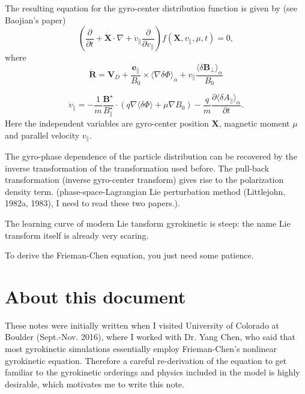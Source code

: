 \documentclass{llncs}
\begin{document}
The resulting equation for the gyro-center distribution function is given by
(see Baojian's paper)
\begin{equation}
  \left( \frac{\partial}{\partial t} + \dot{\mathbf{X}} \cdot \nabla +
  \dot{v}_{\parallel} \frac{\partial}{\partial v_{\parallel}} \right) f
  (\mathbf{X}, v_{\parallel}, \mu, t) = 0,
\end{equation}
where
\begin{equation}
  \dot{\mathbf{R}} =\mathbf{V}_D + \frac{\mathbf{e}_{\parallel}}{B_0} \times
  \langle \nabla \delta \Phi \rangle_{\alpha} + v_{\parallel} \frac{\langle
  \delta \mathbf{B}_{\perp} \rangle_{\alpha}}{B_0}
\end{equation}

\begin{equation}
  \dot{v}_{\parallel} = - \frac{1}{m} 
  \frac{\mathbf{B}^{\star}}{B_{\parallel}^{\star}} \cdot (q \nabla \langle
  \delta \Phi \rangle + \mu \nabla B_0) - \frac{q}{m}  \frac{\partial \langle
  \delta A_{\parallel} \rangle_{\alpha}}{\partial t} .
\end{equation}
Here the independent variables are gyro-center position $\mathbf{X}$, magnetic
moment $\mu$ and parallel velocity $v_{\parallel}$.

The gyro-phase dependence of the particle distribution can be recovered by the
inverse transformation of the transformation used before. The pull-back
transformation (inverse gyro-center transform) gives rise to the polarization
density term. (phase-space-Lagrangian Lie perturbation method (Littlejohn,
1982a, 1983), I need to read these two papers.).

The learning curve of modern Lie tansform gyrokinetic is steep: the name Lie
transform itself is already very scaring.

To derive the Frieman-Chen equation, you just need some patience.

\section{About this document}

These notes were initially written when I visited University of Colorado at
Boulder (Sept.-Nov. 2016), where I worked with Dr. Yang Chen, who said that
most gyrokinetic simulations essentially employ Frieman-Chen's nonlinear
gyrokinetic equation. Therefore a careful re-derivation of the equation to get
familiar to the gyrokinetic orderings and physics included in the model is
highly desirable, which motivates me to write this note.
\end{document}
